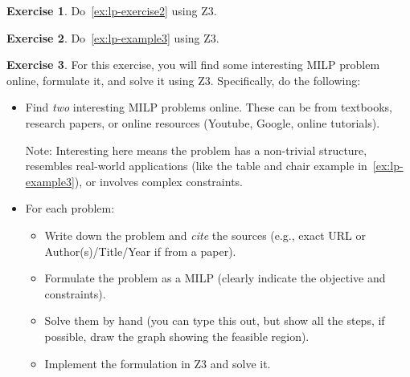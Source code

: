 \documentclass[oneside,11pt,dvipsnames]{book}
\numberwithin{equation}{section}
\theoremstyle{definition}
\newtheorem{exercise}{Exercise}[section]
\theoremstyle{remark}
\begin{document}
\begin{exercise}
Do~\autoref{ex:lp-exercise2} using Z3.
\end{exercise}

\begin{exercise}
Do~\autoref{ex:lp-example3} using Z3.
\end{exercise}



\begin{exercise}\label{ex:milp-online}
For this exercise, you will find some interesting MILP problem online, formulate it, and solve it using Z3. Specifically, do the following:
\begin{itemize}
\item Find \emph{two} interesting MILP problems online. These can be from textbooks, research papers, or online resources (Youtube, Google, online tutorials).

Note: Interesting here means the problem has a non-trivial structure, resembles real-world applications (like the table and chair example in~\autoref{ex:lp-example3}), or involves complex constraints.
\item For each problem:
\begin{itemize}
    \item Write down the problem and \emph{cite} the sources (e.g., exact URL or Author(s)/Title/Year if from a paper).
    \item Formulate the problem as a MILP (clearly indicate the objective and constraints).
    \item Solve them by hand (you can type this out, but show all the steps, if possible, draw the graph showing the feasible region).
    \item Implement the formulation in Z3 and solve it.
\end{itemize}
\end{itemize}

\end{exercise}
\end{document}

